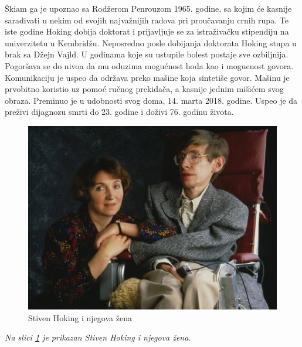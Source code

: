 \documentclass[a4paper, 12pt]{article}
\begin{document}
{Škiam ga je upoznao sa Rodžerom Penrouzom 1965. godine, sa kojim će kasnije sarađivati 
u nekim od svojih najvažnijih radova pri proučavanju crnih rupa. Te iste godine Hoking 
dobija doktorat i prijavljuje se za istraživačku stipendiju na univerzitetu u 
Kembridžu. Neposredno posle dobijanja doktorata Hoking stupa u brak sa Džejn Vajld. 
U godinama koje su ustupile bolest postaje sve ozbiljnija. Pogoršava se do nivoa da mu oduzima mogućnost hoda kao i mogucnost govora.
Komunikaciju je uspeo da održava preko mašine koja sintetiše govor. Mašinu je prvobitno koristio uz pomoć ručnog prekidača, 
a kasnije jednim mišićem svog obraza. Preminuo je u udobnosti svog doma, 14. marta 
2018. godine. Uspeo je da preživi dijagnozu smrti do 23. godine i doživi 76. 
godinu života. \cite{hawkingcom} \cite{famousscientists} 

\newpage
\begin{figure}[h!]
\begin{center}
\includegraphics[width=1.0\textwidth]{StivenHoking.jpeg}
\end{center}
\caption{Stiven Hoking i njegova žena}
\label{fig:StivenHoking}
\end{figure}
\emph {Na slici \ref{fig:StivenHoking} je prikazan Stiven Hoking i njegova žena.}
\bigskip

}
\end{document}
